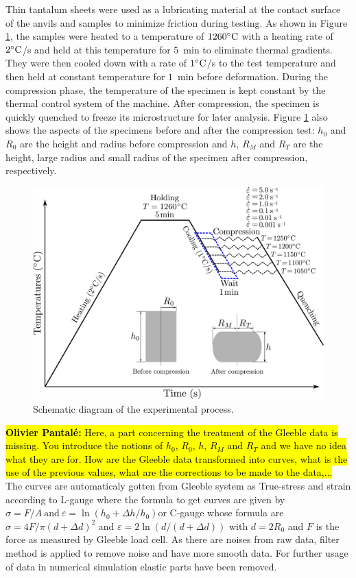 \documentclass[twoside,english,1p,final,sort&compress]{elsarticle}
\theoremstyle{plain}
\DeclareRobustCommand{\OP}[1]{ {\begingroup\sethlcolor{VWyellow}\textcolor{red}{\hl{\textbf{Olivier Pantal\'e:} #1}}\endgroup} }
\begin{document}
Thin tantalum sheets were used as a lubricating material at the contact surface of the anvils and samples to minimize friction during testing.
As shown in Figure \ref{fig:GleebleProcess}, the samples were heated to a temperature of $1260\celsius$ with a heating rate of $2\celsius$/s and held at this temperature for $5$~min to eliminate thermal gradients.
They were then cooled down with a rate of $1\celsius$/s to the test temperature and then held at constant temperature for $1$~min before deformation.
During the compression phase, the temperature of the specimen is kept constant by the thermal control system of the machine.
After compression, the specimen is quickly quenched to freeze its microstructure for later analysis.
Figure \ref{fig:GleebleProcess} also shows the aspects of the specimens before and after the compression test: $h_0$ and $R_0$ are the height and radius before compression and $h$, $R_M$ and $R_T$ are the height, large radius and small radius of the specimen after compression, respectively.
\begin{figure}[!ht]
\centering
\includegraphics[width=0.8\columnwidth]{Figures/GleebleProcess}
\caption{Schematic diagram of the experimental process.}
\label{fig:GleebleProcess}
\end{figure}

\OP{Here, a part concerning the treatment of the Gleeble data is missing.
You introduce the notions of $h_0$, $R_0$, $h$, $R_M$ and $R_T$ and we have no idea what they are for.
How are the Gleeble data transformed into curves, what is the use of the previous values, what are the corrections to be made to the data,...}
The curves are automaticaly gotten from Gleeble system as True-stress and strain according to L-gauge where the formula to get curves are given by $\sigma =F/A\ \text{and}\ \varepsilon = \ln\left(h_0 +\Delta h / h_0\right) $or C-gauge whose formula are $\sigma = 4F/\pi(d+\Delta d)^2$ and $\varepsilon = 2\ln(d/(d+\Delta d))$ with $d = 2R_0$ and $F$ is the force as measured by Gleeble load cell.
As there are noises from raw data, filter method is applied to remove noise and have more smooth data.
For further usage of  data in numerical simulation elastic parts have been removed.
\end{document}
